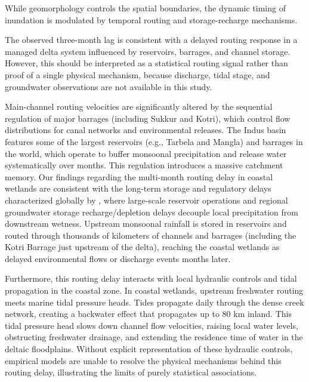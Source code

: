 \documentclass[12pt, a4paper]{article}
\begin{document}
While geomorphology controls the spatial boundaries, the dynamic timing of inundation is modulated by temporal routing and storage-recharge mechanisms.

The observed three-month lag is consistent with a delayed routing response in a managed delta system influenced by reservoirs, barrages, and channel storage. However, this should be interpreted as a statistical routing signal rather than proof of a single physical mechanism, because discharge, tidal stage, and groundwater observations are not available in this study.

Main-channel routing velocities are significantly altered by the sequential regulation of major barrages (including Sukkur and Kotri), which control flow distributions for canal networks and environmental releases. The Indus basin features some of the largest reservoirs (e.g., Tarbela and Mangla) and barrages in the world, which operate to buffer monsoonal precipitation and release water systematically over months. This regulation introduces a massive catchment memory. Our findings regarding the multi-month routing delay in coastal wetlands are consistent with the long-term storage and regulatory delays characterized globally by \citet{Scanlon2023Global}, where large-scale reservoir operations and regional groundwater storage recharge/depletion delays decouple local precipitation from downstream wetness. Upstream monsoonal rainfall is stored in reservoirs and routed through thousands of kilometers of channels and barrages (including the Kotri Barrage just upstream of the delta), reaching the coastal wetlands as delayed environmental flows or discharge events months later.

Furthermore, this routing delay interacts with local hydraulic controls and tidal propagation in the coastal zone. In coastal wetlands, upstream freshwater routing meets marine tidal pressure heads. Tides propagate daily through the dense creek network, creating a backwater effect that propagates up to 80 km inland. This tidal pressure head slows down channel flow velocities, raising local water levels, obstructing freshwater drainage, and extending the residence time of water in the deltaic floodplains. Without explicit representation of these hydraulic controls, empirical models are unable to resolve the physical mechanisms behind this routing delay, illustrating the limits of purely statistical associations.
\end{document}
